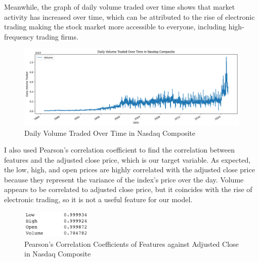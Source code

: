 \documentclass[a4paper, 11pt]{article}
\begin{document}
Meanwhile, the graph of daily volume traded over time shows that market activity has increased over time, which can be attributed to the rise of electronic trading making the stock market more accessible to everyone, including high-frequency trading firms.

\begin{figure}[H]
    \begin{center}
        \includegraphics[width=1\textwidth]{Daily Volume Traded Over Time in Nasdaq Composite.png}
        \caption{Daily Volume Traded Over Time in Nasdaq Composite}
    \end{center}
\end{figure}

I also used Pearson's correlation coefficient to find the correlation between features and the adjusted close price, which is our target variable. As expected, the low, high, and open prices are highly correlated with the adjusted close price because they represent the variance of the index's price over the day. Volume appears to be correlated to adjusted close price, but it coincides with the rise of electronic trading, so it is not a useful feature for our model.

\begin{figure}[H]
    \begin{center}
        \includegraphics[width=0.3\textwidth]{Pearson's Correlation Coefficients.png}
        \caption{Pearson's Correlation Coefficients of Features against Adjusted Close in Nasdaq Composite}
    \end{center}
\end{figure}
\end{document}
